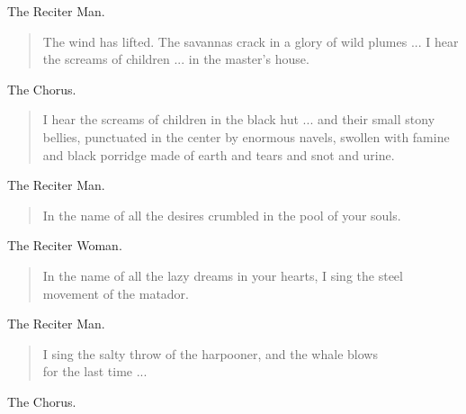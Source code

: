 \documentclass[letterpaper,article,12pt,oneside,notitlepage]{memoir}
\begin{document}
\begin{center}The Reciter Man.\end{center}

\begin{verse}
\indent The wind has lifted. The savannas crack in a glory of wild plumes ... I hear the screams of children ... in the master's house. \\
\end{verse}

\begin{center}The Chorus.\end{center}

\begin{verse}
\indent I hear the screams of children in the black hut ... and their small stony bellies, punctuated in the center by enormous navels, swollen with famine and black porridge made of earth and tears and snot and urine. \\
\end{verse}


\begin{center}The Reciter Man.\end{center}

\begin{verse}
\hspace{1cm} In the name of all the desires crumbled in the pool of your souls. \\
\end{verse}

\begin{center}The Reciter Woman.\end{center}

\begin{verse}
\indent In the name of all the lazy dreams in your hearts, I sing the steel movement of the matador. \\
\end{verse}

\begin{center}The Reciter Man.\end{center}

\begin{verse}
\indent I sing the salty throw of the harpooner, and the whale blows \\
for the last time ... \\
\end{verse}

\clearpage

\begin{center}The Chorus.\end{center}
\end{document}
